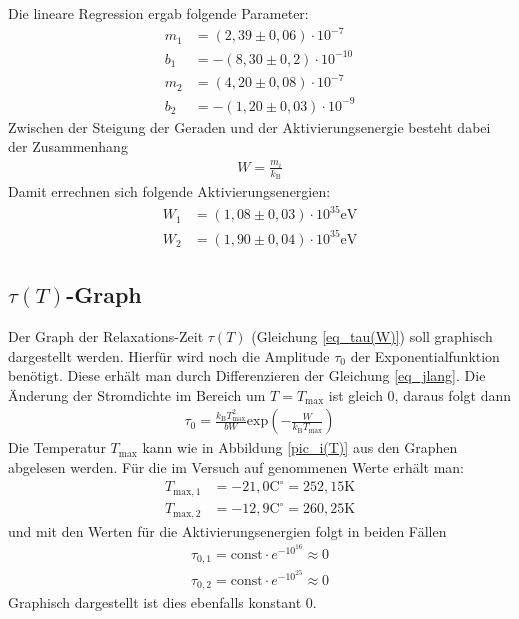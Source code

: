 Die lineare Regression ergab folgende Parameter:
\begin{align*}
m_1&=(2,39   \pm 0,06)\cdot10^{-7}\\
b_1&=-(8,30  \pm 0,2)\cdot10^{-10}\\
m_2&=( 4,20      \pm 0,08)\cdot10^{-7}\\
b_2&=-(1,20    \pm 0,03)\cdot10^{-9}
\end{align*}
Zwischen der Steigung der Geraden und der Aktivierungsenergie besteht dabei der Zusammenhang
\begin{align}
W=\frac{m_i}{k_\text{B}}
\end{align}
Damit errechnen sich folgende Aktivierungsenergien:
\begin{align}
W_1&=(1,08    \pm 0,03)\cdot 10^{35} \text{eV}\\
W_2&=(1,90	\pm 0,04)\cdot 10^{35}\text{eV}
\end{align}

\subsection{$\tau(T)$-Graph}
Der Graph der Relaxations-Zeit $\tau(T)$ (Gleichung \eqref{eq_tau(W)}) soll graphisch dargestellt werden. Hierfür wird noch die Amplitude $\tau_0$ der Exponentialfunktion benötigt.
Diese erhält man durch Differenzieren der Gleichung \eqref{eq_jlang}. Die Änderung der Stromdichte im Bereich um $T=T_\text{max}$ ist gleich 0, daraus folgt dann
\begin{align*}
\tau_0=\frac{k_\text{B}T^2_\text{max}}{bW}\text{exp}\left(-\frac{W}{k_\text{B}T_\text{max}}\right)
\end{align*}
Die Temperatur $T_\text{max}$ kann wie in Abbildung \ref{pic_i(T)} aus den Graphen abgelesen werden. Für die im Versuch auf genommenen Werte erhält man:
\begin{align*}
T_{\text{max},1}&=-21,0\text{C}^\circ=252,15\text{K}\\
T_{\text{max},2}&=-12,9\text{C}^\circ=260,25\text{K}
\end{align*}
und mit den Werten für die Aktivierungsenergien folgt in beiden Fällen
\begin{align*}
\tau_{0,1}=\text{const}\cdot e^{-10^{16}}\approx 0\\
\tau_{0,2}=\text{const}\cdot e^{-10^{25}}\approx 0
\end{align*}
Graphisch dargestellt ist dies ebenfalls konstant 0.

